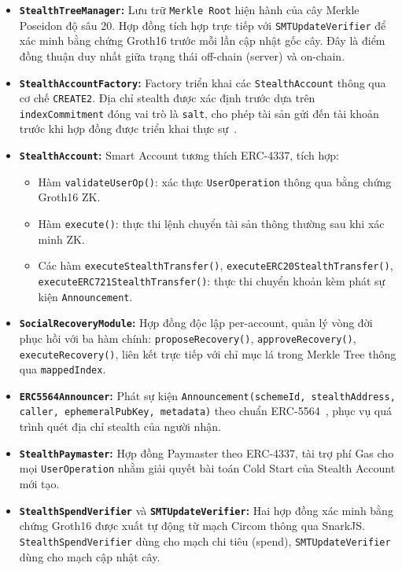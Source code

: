 \documentclass[../DoAn.tex]{subfiles}
\begin{document}
\begin{itemize}
    \item \textbf{\texttt{StealthTreeManager}:} Lưu trữ \texttt{Merkle Root} hiện hành của cây Merkle Poseidon độ sâu 20. Hợp đồng tích hợp trực tiếp với \texttt{SMTUpdateVerifier} để xác minh bằng chứng Groth16 trước mỗi lần cập nhật gốc cây. Đây là điểm đồng thuận duy nhất giữa trạng thái off-chain (server) và on-chain.

    \item \textbf{\texttt{StealthAccountFactory}:} Factory triển khai các \texttt{StealthAccount} thông qua cơ chế \texttt{CREATE2}. Địa chỉ stealth được xác định trước dựa trên \texttt{indexCommitment} đóng vai trò là \texttt{salt}, cho phép tài sản gửi đến tài khoản trước khi hợp đồng được triển khai thực sự~\cite{eip1014}.

    \item \textbf{\texttt{StealthAccount}:} Smart Account tương thích ERC-4337, tích hợp:
    \begin{itemize}
        \item Hàm \texttt{validateUserOp()}: xác thực \texttt{UserOperation} thông qua bằng chứng Groth16 ZK.
        \item Hàm \texttt{execute()}: thực thi lệnh chuyển tài sản thông thường sau khi xác minh ZK.
        \item Các hàm \texttt{executeStealthTransfer()}, \texttt{executeERC20StealthTransfer()}, \texttt{executeERC721StealthTransfer()}: thực thi chuyển khoản kèm phát sự kiện \texttt{Announcement}.
    \end{itemize}

    \item \textbf{\texttt{SocialRecoveryModule}:} Hợp đồng độc lập per-account, quản lý vòng đời phục hồi với ba hàm chính: \texttt{proposeRecovery()}, \texttt{approveRecovery()}, \texttt{executeRecovery()}, liên kết trực tiếp với chỉ mục lá trong Merkle Tree thông qua \texttt{mappedIndex}.

    \item \textbf{\texttt{ERC5564Announcer}:} Phát sự kiện \texttt{Announcement(schemeId, stealthAddress, caller, ephemeralPubKey, metadata)} theo chuẩn ERC-5564~\cite{erc5564}, phục vụ quá trình quét địa chỉ stealth của người nhận.

    \item \textbf{\texttt{StealthPaymaster}:} Hợp đồng Paymaster theo ERC-4337, tài trợ phí Gas cho mọi \texttt{UserOperation} nhằm giải quyết bài toán Cold Start của Stealth Account mới tạo.

    \item \textbf{\texttt{StealthSpendVerifier}} và \textbf{\texttt{SMTUpdateVerifier}:} Hai hợp đồng xác minh bằng chứng Groth16 được xuất tự động từ mạch Circom thông qua SnarkJS. \texttt{StealthSpendVerifier} dùng cho mạch chi tiêu (spend), \texttt{SMTUpdateVerifier} dùng cho mạch cập nhật cây.
\end{itemize}
\end{document}
